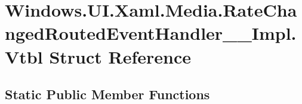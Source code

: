 \hypertarget{struct_windows_1_1_u_i_1_1_xaml_1_1_media_1_1_rate_changed_routed_event_handler_____impl_1_1_vtbl}{}\section{Windows.\+U\+I.\+Xaml.\+Media.\+Rate\+Changed\+Routed\+Event\+Handler\+\_\+\+\_\+\+Impl.\+Vtbl Struct Reference}
\label{struct_windows_1_1_u_i_1_1_xaml_1_1_media_1_1_rate_changed_routed_event_handler_____impl_1_1_vtbl}
\subsection*{Static Public Member Functions}
